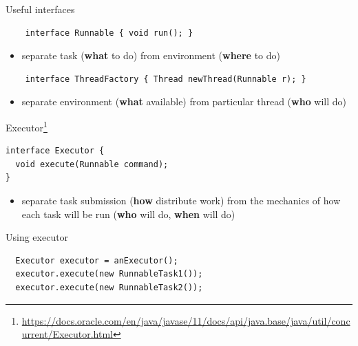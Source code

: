 \begin{frame}{Useful interfaces}

\begin{verbatim}
    interface Runnable { void run(); }
\end{verbatim}
\begin{itemize}
    \item separate task (\textbf{what} to do) from environment (\textbf{where} to do)
\end{itemize}

\begin{verbatim}
    interface ThreadFactory { Thread newThread(Runnable r); }
\end{verbatim}

\begin{itemize}
    \item separate environment (\textbf{what} available) from particular thread (\textbf{who} will do)
\end{itemize}

\pause

Executor\footnote<2->{\tiny\url{https://docs.oracle.com/en/java/javase/11/docs/api/java.base/java/util/concurrent/Executor.html}}

\begin{verbatim}
interface Executor {
  void execute(Runnable command);
}
\end{verbatim}

\begin{itemize}
    \item separate task submission (\textbf{how} distribute work) from the mechanics of how each task will be run (\textbf{who} will do, \textbf{when} will do)
\end{itemize}

\end{frame}


\begin{frame}[t,fragile]{Using executor}
\begin{verbatim}
  Executor executor = anExecutor();
  executor.execute(new RunnableTask1());
  executor.execute(new RunnableTask2());
\end{verbatim}
\end{frame}


